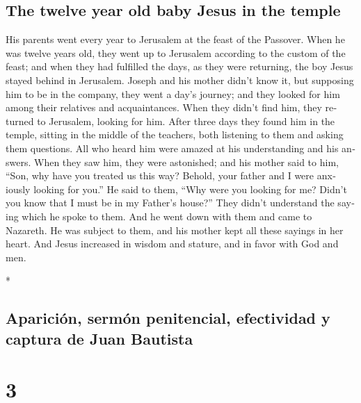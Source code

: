\begin{paracol}{2}
\begin{otherlanguage}{english}
\hypertarget{the-twelve-year-old-baby-jesus-in-the-temple}{%
\subsection{The twelve year old baby Jesus in the
temple}\label{the-twelve-year-old-baby-jesus-in-the-temple}}

 His parents went every year to Jerusalem at the feast of
the Passover.  When he was twelve years old, they went up
to Jerusalem according to the custom of the feast;  and
when they had fulfilled the days, as they were returning, the boy Jesus
stayed behind in Jerusalem. Joseph and his mother didn't know it,
 but supposing him to be in the company, they went a
day's journey; and they looked for him among their relatives and
acquaintances.  When they didn't find him, they returned
to Jerusalem, looking for him.  After three days they
found him in the temple, sitting in the middle of the teachers, both
listening to them and asking them questions.  All who
heard him were amazed at his understanding and his answers.
 When they saw him, they were astonished; and his mother
said to him, ``Son, why have you treated us this way? Behold, your
father and I were anxiously looking for you.''  He said
to them, ``Why were you looking for me? Didn't you know that I must be
in my Father's house?''  They didn't understand the
saying which he spoke to them.  And he went down with
them and came to Nazareth. He was subject to them, and his mother kept
all these sayings in her heart.  And Jesus increased in
wisdom and stature, and in favor with God and men.

\end{otherlanguage}

\switchcolumn[0]*

\hypertarget{apariciuxf3n-sermuxf3n-penitencial-efectividad-y-captura-de-juan-bautista}{%
\subsection{Aparición, sermón penitencial, efectividad y captura de Juan
Bautista}\label{apariciuxf3n-sermuxf3n-penitencial-efectividad-y-captura-de-juan-bautista}}

\hypertarget{section-4}{%
\section{3}\label{section-4}}


\end{paracol}
